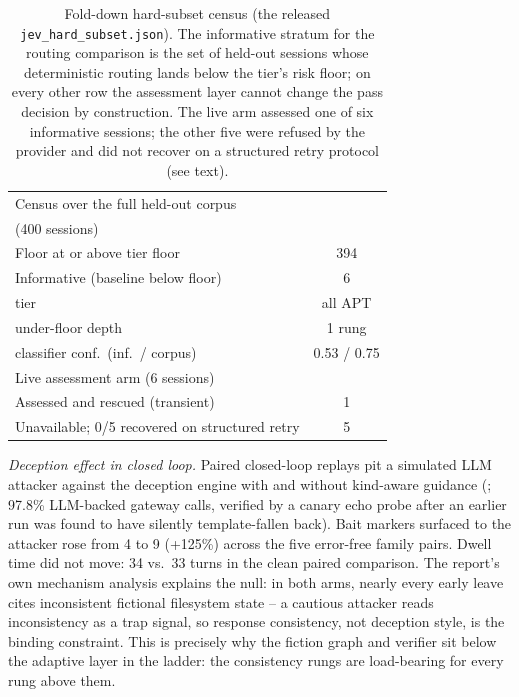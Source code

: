 \begin{table}[t]
\centering
\caption{Fold-down hard-subset census (the released
\texttt{jev\_hard\_subset.json}). The informative stratum for the routing
comparison is the set of held-out sessions whose deterministic routing
lands below the tier's risk floor; on every other row the assessment
layer cannot change the pass decision by construction. The live arm
assessed one of six informative sessions; the other five were refused
by the provider and did not recover on a structured retry protocol
(see text).}
\label{tab:hardsunset}
\small
\setlength{\tabcolsep}{4pt}
\begin{tabular}{@{}lc@{}}
\toprule
Census over the full held-out corpus & \\
(400 sessions) & \\
\midrule
Floor at or above tier floor & 394 \\
Informative (baseline below floor) & 6 \\
\quad tier & all APT \\
\quad under-floor depth & 1 rung \\
\quad classifier conf.\ (inf.\ / corpus) & 0.53 / 0.75 \\
\midrule
Live assessment arm (6 sessions) & \\
\midrule
Assessed and rescued (transient) & 1 \\
Unavailable; 0/5 recovered on structured retry & 5 \\
\bottomrule
\end{tabular}
\end{table}

\emph{Deception effect in closed loop.} Paired closed-loop replays pit a
simulated LLM attacker against the deception engine with and without
kind-aware guidance (; 97.8\%
LLM-backed gateway calls, verified by a canary echo probe after an
earlier run was found to have silently template-fallen back). Bait
markers surfaced to the attacker rose from 4 to 9 (+125\%) across the
five error-free family pairs. Dwell time did not move: 34 vs.\ 33 turns
in the clean paired comparison. The report's own mechanism analysis
explains the null: in both arms, nearly every early leave cites
inconsistent fictional filesystem state -- a cautious attacker reads
inconsistency as a trap signal, so response consistency, not deception
style, is the binding constraint. This is precisely why the fiction
graph and verifier sit below the adaptive layer in the ladder: the
consistency rungs are load-bearing for every rung above them.

